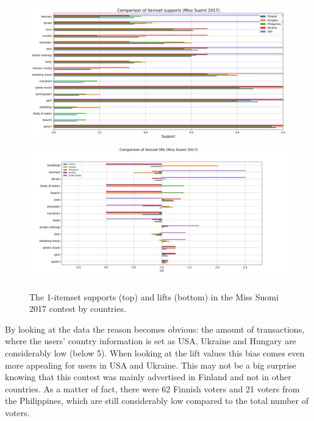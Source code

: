 \begin{figure}[] 
    \begin{center}
        \includegraphics[width=1.2\textwidth,center]{Images/itemset_supports-country-Miss_Helsinki-1_itemset.png}
        \includegraphics[width=1.2\textwidth,center]{Images/itemset_lifts-country-Miss_Suomi-1_itemsets.png}
        \caption{The 1-itemset supports (top) and lifts (bottom) in the Miss Suomi 2017 contest by countries.}
        \label{itemset_supports-country-Miss_Helsinki-1_itemset}
    \end{center}
\end{figure}

By looking at the data the reason becomes obvious: the amount of transactions, where the users' country information is set as USA, Ukraine and Hungary are considerably low (below 5). When looking at the lift values this bias comes even more appealing for users in USA and Ukraine. This may not be a big surprise knowing that this contest was mainly advertised in Finland and not in other countries. As a matter of fact, there were 62 Finnish voters and 21 voters from the Philippines, which are still considerably low compared to the total number of voters. 

